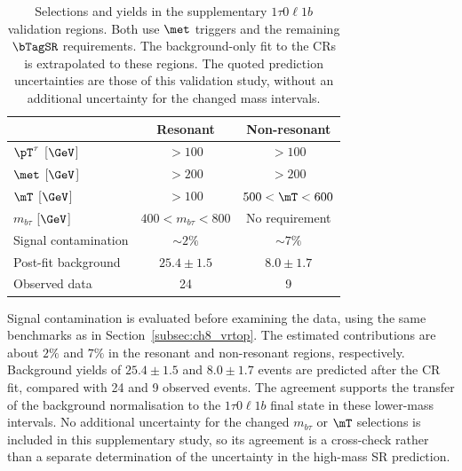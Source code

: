 \begin{table}[htbp]
    \centering
    \small
    \caption{Selections and yields in the supplementary $1\tau0\ell1b$ validation regions. Both use $\met$ triggers and the remaining $\bTagSR$ requirements. The background-only fit to the CRs is extrapolated to these regions. The quoted prediction uncertainties are those of this validation study, without an additional uncertainty for the changed mass intervals.}
    \label{tab:ch8_tau1b_vr}
    \begin{tabular}{lcc}
        \toprule
         & Resonant & Non-resonant \\
        \midrule
        $\pT^\tau$ [$\GeV$] & $>100$ & $>100$ \\
        $\met$ [$\GeV$] & $>200$ & $>200$ \\
        $\mT$ [$\GeV$] & $>100$ & $500<\mT<600$ \\
        $m_{b\tau}$ [$\GeV$] & $400<m_{b\tau}<800$ & No requirement \\
        \midrule
        Signal contamination & $\sim2\%$ & $\sim7\%$ \\
        Post-fit background & $25.4\pm1.5$ & $8.0\pm1.7$ \\
        Observed data & 24 & 9 \\
        \bottomrule
    \end{tabular}
\end{table}

Signal contamination is evaluated before examining the data, using the same benchmarks as in Section~\ref{subsec:ch8_vrtop}.
The estimated contributions are about $2\%$ and $7\%$ in the resonant and non-resonant regions, respectively.
Background yields of $25.4\pm1.5$ and $8.0\pm1.7$ events are predicted after the CR fit, compared with 24 and 9 observed events.
The agreement supports the transfer of the background normalisation to the $1\tau0\ell1b$ final state in these lower-mass intervals.
No additional uncertainty for the changed $m_{b\tau}$ or $\mT$ selections is included in this supplementary study, so its agreement is a cross-check rather than a separate determination of the uncertainty in the high-mass SR prediction.
